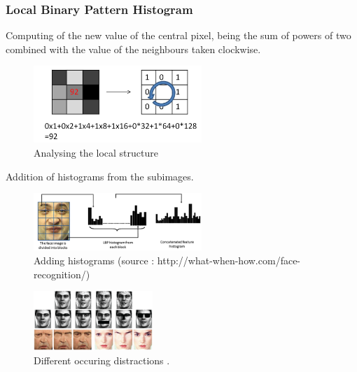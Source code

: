 \subsubsection{Local Binary Pattern Histogram}

Computing of the new value of the central pixel, being the sum of powers of two combined with the value of the neighbours taken clockwise.
\begin{figure}[ht]
\centering
\includegraphics[width=2.5in]{rsrc/LBPH1.jpg}
\caption{Analysing the local structure}
\label{Local Structure}
\end{figure}

Addition of histograms from the subimages.

\begin{figure}[ht]
\centering
\includegraphics[width=2.5in]{rsrc/LBPH2.png}
\caption{Adding histograms (source : http://what-when-how.com/face-recognition/)}
\label{Adding histograms}
\end{figure}

\begin{figure}[ht]
\centering		
\includegraphics[width = 0.4\textwidth]{rsrc/faces.png}	\caption{Different occuring distractions \cite{Occlusion&noise}.}
\label{fig:Distractions}
\end{figure}



